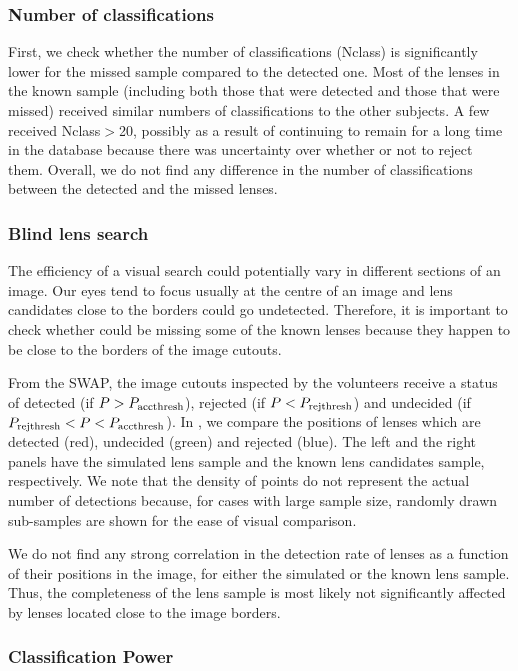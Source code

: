 \documentclass[useAMS,usenatbib,a4paper]{mn2e}
\begin{document}
\subsubsection{Number of classifications}

First, we check whether the number of classifications (Nclass) is
significantly lower for the missed sample compared to the detected one.
Most of the lenses in the known sample (including both those that were
detected and those that were missed)
received similar numbers of classifications to the other subjects.
A few received Nclass$>$20, possibly as a result of
continuing to remain for a long time in the database because there was
uncertainty over whether or not to reject them.
Overall, we do not find any difference in the number of classifications
between the detected and the missed lenses.

\subsubsection{Blind lens search}

The efficiency of a visual search could potentially
vary in different sections of an
image. Our eyes tend to focus usually at the centre of an image and lens
candidates close to the borders could go undetected. Therefore, it is
important to check whether \sw could be missing some of the known lenses
because they happen to be close to the borders of the image cutouts.

From the SWAP, the image cutouts inspected by the \sw volunteers receive
a status of detected (if $P>P_{\rm acc thresh}$), rejected (if
$P<P_{\rm rej thresh}$) and undecided (if $P_{\rm rej thresh}< P <
P_{\rm acc thresh}$). In , we compare the positions
of lenses which are detected (red), undecided (green) and rejected
(blue). The left and the right panels have the simulated lens sample and
the known lens candidates sample, respectively. We note that the density
of points do not represent the actual number of detections because, for
cases with large sample size, randomly drawn sub-samples are shown for
the ease of visual comparison.

We do not find any strong correlation in the detection rate of
lenses as a function of their positions in the image, for either the
simulated or the known lens sample. Thus, the completeness of the lens
sample is most likely not significantly affected by lenses
located close to the image borders.

\subsubsection{Classification Power}
\end{document}
